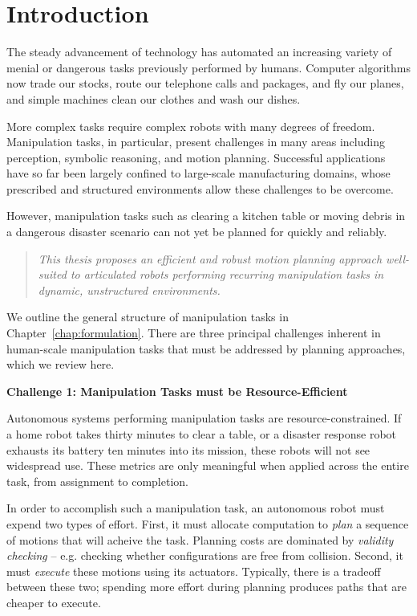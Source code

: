 \chapter{Introduction}

The steady advancement of technology
has automated an increasing variety of menial or dangerous tasks
previously performed by humans.
Computer algorithms now trade our stocks,
route our telephone calls and packages,
and fly our planes,
and simple machines clean our clothes and wash our dishes.

More complex tasks require complex robots with many
degrees of freedom.
Manipulation tasks, in particular,
present challenges in many areas including
perception, symbolic reasoning, and motion planning.
Successful applications have so far been largely
confined to large-scale manufacturing domains,
whose prescribed and structured environments
allow these challenges to be overcome.

However,
manipulation tasks such as clearing a kitchen table
or moving debris in a dangerous disaster scenario
can not yet be planned for quickly and reliably.
\begin{quote}
\emph{%
This thesis proposes an
efficient and robust motion planning approach
well-suited
to articulated robots
performing recurring manipulation tasks
in dynamic, unstructured environments.
}
\end{quote}

We outline the general structure of manipulation tasks
in Chapter~\ref{chap:formulation}.
There are three principal challenges inherent in
human-scale manipulation tasks
that must be addressed by planning approaches,
which we review here.

\textbf{Challenge 1: Manipulation Tasks must be Resource-Efficient}

Autonomous systems performing manipulation tasks are
resource-constrained.
If a home robot takes thirty minutes to clear a table,
or a disaster response robot exhausts its battery ten minutes
into its mission,
these robots will not see widespread use.
These metrics are only meaningful
when applied across the entire task,
from assignment to completion.

In order to accomplish such a manipulation task,
an autonomous robot must expend two types of effort.
First, it must allocate computation to \emph{plan}
a sequence of motions that will acheive the task.
Planning costs are dominated by \emph{validity checking} --
e.g. checking whether configurations are free from collision.
Second, it must \emph{execute} these motions using its actuators.
Typically, there is a tradeoff between these two;
spending more effort during planning produces paths that are
cheaper to execute.

